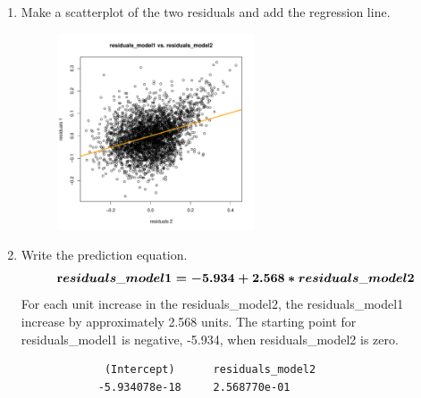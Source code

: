 \documentclass[12pt,letterpaper]{article}
\begin{document}
\begin{enumerate}
		\item Make a scatterplot of the two residuals and add the regression line.
			\begin{figure}[h!]
			\centering
			\includegraphics[width=0.55\textwidth]{plot_question4.pdf}
			\end{figure}
			\vspace{1cm}
		
		

		
		\item Write the prediction equation.
			\vspace{.25cm}
			\[
			\boldmath
			\textbf
			residuals\_model1 = -5.934 + 2.568 * residuals\_model2
			\]
			For each unit increase in the residuals\_model2, the residuals\_model1 increase by approximately 2.568 units. The starting point for residuals\_model1 is negative, -5.934, when residuals\_model2 is zero.
			\vspace{.25cm}
			 
			\begin{verbatim}
			 (Intercept)      residuals_model2 
			-5.934078e-18     2.568770e-01 
			\end{verbatim}			
		
		
		
	\end{enumerate}
	
	\newpage	
\end{document}
